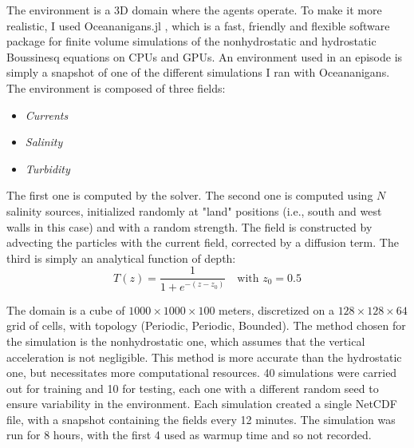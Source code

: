 The environment is a 3D domain where the agents operate. To make it more realistic,
I used Oceananigans.jl \cite{Oceananigans-overview-paper-2025}, which is a 
fast, friendly and flexible software package for finite volume simulations of the 
nonhydrostatic and hydrostatic Boussinesq equations on CPUs and GPUs. An environment 
used in an episode is simply a snapshot of one of the different simulations
I ran with Oceananigans. The environment is composed of three fields:
\begin{itemize}
    \item \textit{Currents}
    \item \textit{Salinity}
    \item \textit{Turbidity}
\end{itemize}
The first one is computed by the solver. The second one is computed using
$N$ salinity sources, initialized randomly at "land" positions (i.e., south 
and west walls in this case) and with a random strength. The field is constructed 
by advecting the particles with the current field, corrected by a diffusion 
term. The third is simply an analytical function of depth:
\begin{equation}
    T(z) = \frac{1}{1 + e^{-(z - z_0)}} \quad \text{with } z_0 = 0.5
\end{equation}

The domain is a cube of $1000 \times 1000 \times 100$ meters, discretized
on a $128 \times 128 \times 64$ grid of cells, with topology (Periodic, Periodic, Bounded). The method chosen for the 
simulation is the nonhydrostatic one, which assumes that the vertical
acceleration is not negligible. This method is more accurate than the 
hydrostatic one, but necessitates more computational resources. 40 simulations
were carried out for training and 10 for testing, each one with a different random seed to ensure variability
in the environment. Each simulation created a single NetCDF file, with a snapshot
containing the fields every 12 minutes. The simulation was run for 8 hours,
with the first 4 used as warmup time and so not recorded. 

